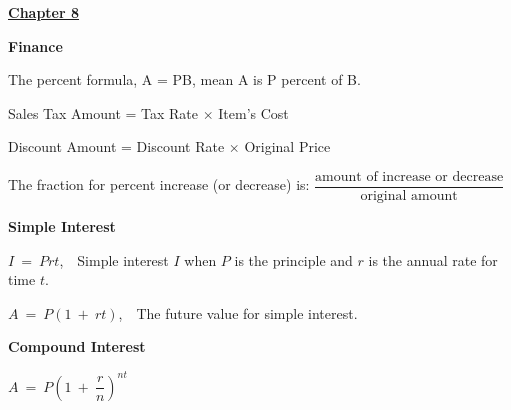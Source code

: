 \documentclass{article}
\begin{document}
\begin{large}








\vspace{0.25in}

\underline{\textbf{\huge Chapter 8 \phantom{ } \phantom{ } \phantom{ } \phantom{ }}}

\textbf{Finance}

\hspace{0.1in} The percent formula, A = PB, mean A is P percent of B.

\hspace{0.1in} Sales Tax Amount = Tax Rate $\times$ Item's Cost

\hspace{0.1in} Discount Amount = Discount Rate $\times$ Original Price

\hspace{0.1in} The fraction for percent increase (or decrease) is: $\dfrac{\text{amount of increase or decrease}}{\text{original amount}}$

\textbf{Simple Interest}

\hspace{0.1in} $I\ =\ Prt$,\ \ Simple interest $I$ when $P$ is the principle and $r$ is the annual rate for time $t$.

\hspace{0.1in} $A\ =\ P(1\ +\ rt)$,\ \ The future value for simple interest.

\textbf{Compound Interest}

\hspace{2.5in} $A\ =\ P\left(1\ +\ \dfrac{r}{n}\right)^{nt}$


\end{large}
\end{document}
